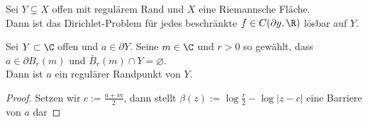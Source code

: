 \begin{thm}
  \label{thm:dirichlet}
  Sei $Y \subsetneq X$ offen mit regulärem Rand und $X$ eine
  Riemannsche Fläche. \\
  Dann ist das Dirichlet-Problem für jedes beschränkte $f \in
  C(\partial y, \R)$ lösbar auf $Y$.
\end{thm}

\begin{thm}
  Sei $Y \subset \C$ offen und $a \in \partial Y$. Seine $m \in \C$
  und $r > 0$ so gewählt, dass $a \in \partial B_r(m)$ und $\bar
  B_r(m) \cap Y = \varnothing$.\\
  Dann ist $a$ ein regulärer Randpunkt von $Y$.
\end{thm}

\begin{proof}
  Setzen wir $c := \frac{a+m}{2}$, dann stellt $\beta(z) := \log
  \frac{r}{2} - \log|z-c|$ eine Barriere von $a$ dar
\end{proof}




